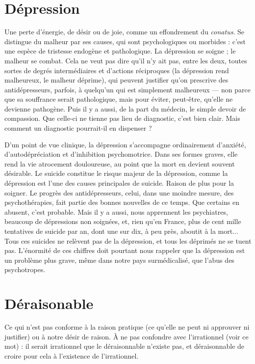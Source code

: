 \section{Dépression}
Une perte d'énergie, de désir ou de joie, comme un effondrement
du {\it conatus}. Se distingue du malheur par ses causes,
qui sont psychologiques ou morbides : c’est une espèce de tristesse endogène et
pathologique. La dépression se soigne ; le malheur se combat. Cela ne veut pas
dire qu’il n’y ait pas, entre les deux, toutes sortes de degrés intermédiaires et
d’actions réciproques (la dépression rend malheureux, le malheur déprime), qui
peuvent justifier qu’on prescrive des antidépresseurs, parfois, à quelqu’un qui
est simplement malheureux — non parce que sa souffrance serait pathologique,
mais pour éviter, peut-être, qu’elle ne devienne pathogène. Puis il y a aussi, de
la part du médecin, le simple devoir de compassion. Que celle-ci ne tienne pas
lieu de diagnostic, c’est bien clair. Mais comment un diagnostic pourrait-il en
dispenser ?

D'un point de vue clinique, la dépression s'accompagne ordinairement
d’anxiété, d’autodépréciation et d’inhibition psychomotrice. Dans ses formes
graves, elle rend la vie atrocement douloureuse, au point que la mort en devient
souvent désirable. Le suicide constitue le risque majeur de la dépression,
comme la dépression est l’une des causes principales de suicide. Raison de plus
pour la soigner. Le progrès des antidépresseurs, celui, dans une moindre
mesure, des psychothérapies, fait partie des bonnes nouvelles de ce temps. Que
certains en abusent, c’est probable. Mais il y a aussi, nous apprennent les psychiatres,
beaucoup de dépressions non soignées, et, rien qu’en France, plus de
cent mille tentatives de suicide par an, dont une sur dix, à peu près, aboutit à
la mort... Tous ces suicides ne relèvent pas de la dépression, et tous les
déprimés ne se tuent pas. L’énormité de ces chiffres doit pourtant nous rappeler
que la dépression est un problème plus grave, même dans notre pays surmédicalisé,
que l’abus des psychotropes.

\section{Déraisonable}
Ce qui n’est pas conforme à la raison pratique (ce
qu’elle ne peut ni approuver ni justifier) ou à notre
désir de raison. À ne pas confondre avec l’irrationnel (voir ce mot) : il serait
irrationnel que le déraisonnable n'existe pas, et déraisonnable de croire pour
cela à l’existence de l’irrationnel.

